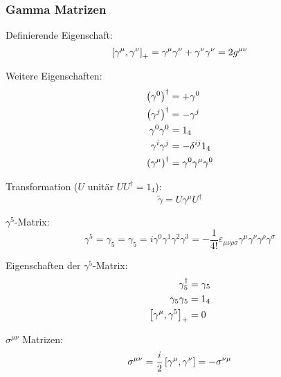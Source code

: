 \documentclass[11pt]{article}
\numberwithin{equation}{section}
\begin{document}
      \subsubsection{Gamma Matrizen}
        Definierende Eigenschaft:
        \begin{equation}
          \left[\gamma^\mu,\gamma^\nu\right]_{+} = \gamma^\mu \gamma^\nu + \gamma^\nu \gamma^\nu = 2g^{\mu\nu}
        \end{equation}

        Weitere Eigenschaften:
        \begin{equation}
          \begin{aligned}
            \br{\gamma^0}^\dagger &= +\gamma^0 \\
            \br{\gamma^j}^\dagger &= -\gamma^j \\
            \gamma^0 \gamma^0 &= 1_4 \\ %
            \gamma^i \gamma^j &= - \delta^{ij} 1_4 \\
            \br{\gamma^\mu}^\dagger &= \gamma^0 \gamma^\mu \gamma^0 \\
          \end{aligned}
        \end{equation}

        Transformation ($U$ unitär $U U^\dagger=1_4$):
        \begin{equation}
          \tilde{\gamma} = U \gamma^\mu U^\dagger
        \end{equation}

        $\gamma^5$-Matrix:
        \begin{equation}
          \gamma^5 = \gamma_5 = \gamma_5 = i\gamma^0 \gamma^1 \gamma^2 \gamma^3 = -\frac{1}{4!}\varepsilon_{\mu\nu\rho\sigma} \gamma^\mu \gamma^\nu \gamma^\rho \gamma^\sigma
        \end{equation}

        Eigenschaften der $\gamma^5$-Matrix:
        \begin{equation}
          \begin{aligned}
            \gamma_5^\dagger &= \gamma_5 \\
            \gamma_5 \gamma_5 &= 1_4 \\
            \left[\gamma^\mu,\gamma^5\right]_{+} &= 0 \\
          \end{aligned}
        \end{equation}

        $\sigma^{\mu\nu}$ Matrizen:
        \begin{equation}
          \sigma^{\mu\nu} = \frac{i}{2}\left[\gamma^\mu,\gamma^\nu\right] = -\sigma^{\nu\mu}
        \end{equation}
\end{document}
